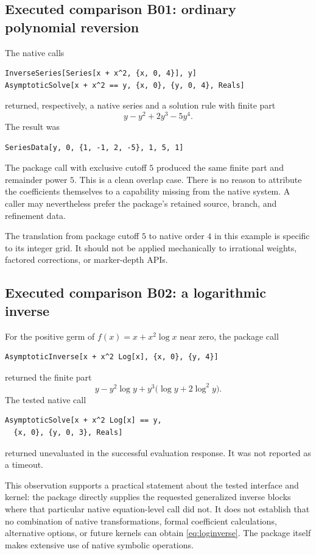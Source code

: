 \documentclass[11pt,letterpaper]{article}
\newcommand{\code}[1]{\texttt{\detokenize{#1}}}
\begin{document}
\subsection{Executed comparison B01: ordinary polynomial reversion}
The native calls
\begin{lstlisting}
InverseSeries[Series[x + x^2, {x, 0, 4}], y]
AsymptoticSolve[x + x^2 == y, {x, 0}, {y, 0, 4}, Reals]
\end{lstlisting}
returned, respectively, a native series and a solution rule with finite part
\begin{equation}
 y-y^2+2y^3-5y^4.
\end{equation}
The \code{InverseSeries} result was
\begin{lstlisting}
SeriesData[y, 0, {1, -1, 2, -5}, 1, 5, 1]
\end{lstlisting}
The package call with exclusive cutoff $5$ produced the same finite part and remainder power $5$. This is a clean overlap case. There is no reason to attribute the coefficients themselves to a capability missing from the native system. A caller may nevertheless prefer the package's retained source, branch, and refinement data.

The translation from package cutoff $5$ to native order $4$ in this example is specific to its integer grid. It should not be applied mechanically to irrational weights, factored corrections, or marker-depth APIs.

\subsection{Executed comparison B02: a logarithmic inverse}
For the positive germ of $f(x)=x+x^2\log x$ near zero, the package call
\begin{lstlisting}
AsymptoticInverse[x + x^2 Log[x], {x, 0}, {y, 4}]
\end{lstlisting}
returned the finite part
\begin{equation}
 y-y^2\log y+y^3\bigl(\log y+2\log^2 y\bigr).
 \label{eq:loginverse}
\end{equation}
The tested native call
\begin{lstlisting}
AsymptoticSolve[x + x^2 Log[x] == y,
  {x, 0}, {y, 0, 3}, Reals]
\end{lstlisting}
returned unevaluated in the successful evaluation response. It was not reported as a timeout.

This observation supports a practical statement about the tested interface and kernel: the package directly supplies the requested generalized inverse blocks where that particular native equation-level call did not. It does not establish that no combination of native transformations, formal coefficient calculations, alternative options, or future kernels can obtain \eqref{eq:loginverse}. The package itself makes extensive use of native symbolic operations.
\end{document}

